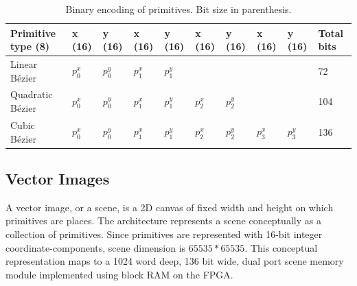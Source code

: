 \begin{table}[h]
    \centering
    \begin{tabular}{|l|l|l|l|l|l|l|l|l|l|}
    \hline
    Primitive type (8) & x (16) & y (16) & x (16) & y (16) & x (16) & y (16) & x (16) & y (16) & Total bits \\ \hline
    Linear Bézier    & \(p_0^x \) & \(p_0^y \) & \(p_1^x \) & \(p_1^y \) & ~   & ~   & ~   & ~   & 72    \\ \hline
    Quadratic Bézier & \(p_0^x \) & \(p_0^y \) & \(p_1^x \) & \(p_1^y \) & \(p_2^x \) & \(p_2^y \) & ~   & ~   & 104   \\ \hline
    Cubic Bézier     & \(p_0^x \) & \(p_0^y \) & \(p_1^x \) & \(p_1^y \) & \(p_2^x \) & \(p_2^y \) & \(p_3^x \) & \(p_3^y \) & 136   \\ \hline
    \end{tabular}
    \caption{Binary encoding of primitives. Bit size in parenthesis.}
	\label{tbl:primitives}
\end{table}

\subsection{Vector Images}

A vector image, or a scene, is a 2D canvas of fixed width and height on which primitives are places.
The \vthreek architecture represents a scene conceptually as a collection of primitives.
Since primitives are represented with 16-bit integer coordinate-components, scene dimension is $65535 * 65535$.
This conceptual representation maps to a 1024 word deep, 136 bit wide, dual port scene memory module implemented using block RAM \cite{xilinx-block-ram} on the FPGA.
